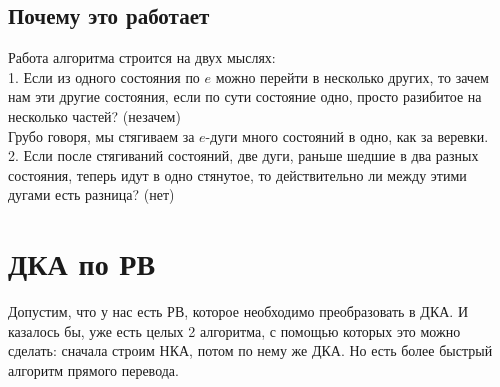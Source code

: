 \documentclass[14pt]{extreport}
\begin{document}
	\section*{Почему это работает}
	Работа алгоритма строится на двух мыслях:\\
	1. Если из одного состояния по $e$ можно перейти в несколько других,
	то зачем нам эти другие состояния, если по сути состояние одно, просто
	разибитое на несколько частей? (незачем)\\
	Грубо говоря, мы стягиваем за $e$-дуги много состояний в одно, как за веревки.\\
	2. Если после стягиваний состояний, две дуги, раньше шедшие в два разных состояния,
	теперь идут в одно стянутое, то действительно ли между этими дугами есть разница? (нет)\\
	\newpage
	\chapter{ДКА по РВ}
	Допустим, что у нас есть РВ, которое необходимо преобразовать в ДКА. И казалось бы, уже есть
	целых 2 алгоритма, с помощью которых это можно сделать: сначала строим НКА, потом по нему же
	ДКА. Но есть более быстрый алгоритм прямого перевода.
\end{document}
